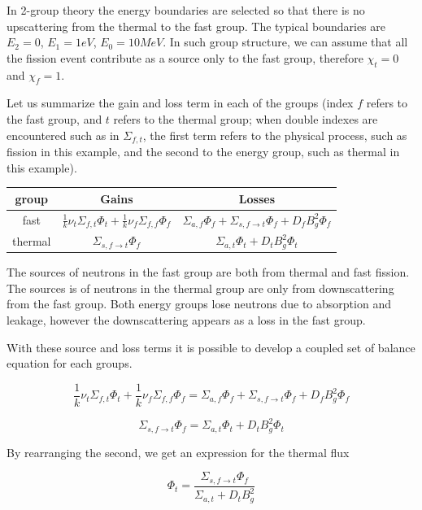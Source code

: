 In 2-group theory the energy boundaries are selected so that there is no upscattering from the thermal to the fast group. The typical boundaries are $E_2=0$, $E_1=1 eV$, $E_0=10 MeV$. In such group structure, we can assume that all the fission event contribute as a source only to the fast group, therefore $\chi_t=0$ and $\chi_f=1$.

Let us summarize the gain and loss term in each of the groups (index $f$ refers to the fast group, and $t$ refers to the thermal group; when double indexes are encountered such as in $\Sigma_{f,t}$, the first term refers to the physical process, such as fission in this example, and the second to the energy group, such as thermal in this example).


\begin{tabular}{c | c | c}
group & Gains & Losses \\
\hline
fast & $\frac{1}{k}\nu_t\Sigma_{f,t}\Phi_t+\frac{1}{k}\nu_f\Sigma_{f,f}\Phi_f$ & $\Sigma_{a,f}\Phi_f + \Sigma_{s,f\rightarrow t}\Phi_f + D_fB_g^2\Phi_f$  \\
\hline
thermal & $\Sigma_{s,f\rightarrow t}\Phi_f$ & $\Sigma_{a,t}\Phi_t  + D_tB_g^2\Phi_t$ 
\end{tabular}

The sources of neutrons in the fast group are both from thermal and fast fission. The sources is of neutrons in the thermal group are only from downscattering from the fast group. Both energy groups lose neutrons due to absorption and leakage, however the downscattering appears as a loss in the fast group.

With these source and loss terms it is possible to develop a coupled set of balance equation for each groups.

\begin{equation}
\frac{1}{k}\nu_t\Sigma_{f,t}\Phi_t+\frac{1}{k}\nu_f\Sigma_{f,f}\Phi_f=\Sigma_{a,f}\Phi_f + \Sigma_{s,f\rightarrow t}\Phi_f + D_fB_g^2\Phi_f 
\end{equation}

\begin{equation*}
\Sigma_{s,f\rightarrow t}\Phi_f = \Sigma_{a,t}\Phi_t  + D_tB_g^2\Phi_t
\end{equation*}


By rearranging the second, we get an expression for the thermal flux

\begin{equation}
\Phi_t=\frac{\Sigma_{s,f\rightarrow t}\Phi_f}{\Sigma_{a,t}  + D_tB_g^2}
\end{equation}

